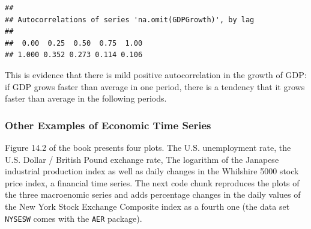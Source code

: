\documentclass[]{book}
\newenvironment{Shaded}{\begin{snugshade}}{\end{snugshade}}
\newcommand{\KeywordTok}[1]{\textcolor[rgb]{0.13,0.29,0.53}{\textbf{#1}}}
\newcommand{\StringTok}[1]{\textcolor[rgb]{0.31,0.60,0.02}{#1}}
\newcommand{\CommentTok}[1]{\textcolor[rgb]{0.56,0.35,0.01}{\textit{#1}}}
\newcommand{\OperatorTok}[1]{\textcolor[rgb]{0.81,0.36,0.00}{\textbf{#1}}}
\newcommand{\NormalTok}[1]{#1}
\theoremstyle{definition}
\theoremstyle{definition}
\theoremstyle{definition}
\theoremstyle{remark}
\begin{document}
\begin{verbatim}
## 
## Autocorrelations of series 'na.omit(GDPGrowth)', by lag
## 
##  0.00  0.25  0.50  0.75  1.00 
## 1.000 0.352 0.273 0.114 0.106
\end{verbatim}

This is evidence that there is mild positive autocorrelation in the
growth of GDP: if GDP grows faster than average in one period, there is
a tendency that it grows faster than average in the following periods.

\subsubsection*{Other Examples of Economic Time
Series}\label{other-examples-of-economic-time-series}

Figure 14.2 of the book presents four plots. The U.S. unemployment rate,
the U.S. Dollar / British Pound exchange rate, The logarithm of the
Janapese industrial production index as well as daily changes in the
Whilshire 5000 stock price index, a financial time series. The next code
chunk reproduces the plots of the three macroenomic series and adds
percentage changes in the daily values of the New York Stock Exchange
Composite index as a fourth one (the data set \texttt{NYSESW} comes with
the \texttt{AER} package).

\begin{Shaded}
\end{Shaded}
\end{document}
